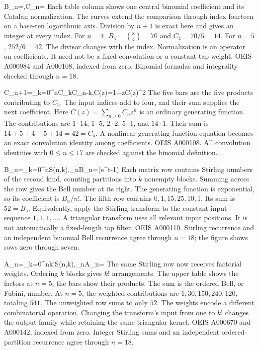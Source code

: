 {B_n=,\qquad C_n=}
{Each table column shows one central binomial coefficient and its Catalan normalization. The curves extend the comparison through index fourteen on a base-ten logarithmic axis. Division by $n+1$ is exact here and gives an integer at every index.}
{For $n=4$, $B_4=\binom84=70$ and $C_4=70/5=14$. For $n=5$, $252/6=42$. The divisor changes with the index.}
{Normalization is an operator on coefficients. It need not be a fixed convolution or a constant tap weight.}
{OEIS A000984 and A000108, indexed from zero. Binomial formulas and integrality checked through $n=18$.}

{C_{n+1}=\sum_{k=0}^{n}C_kC_{n-k},\qquad C(z)=1+zC(z)^2}
{The five bars are the five products contributing to $C_5$. The input indices add to four, and their sum supplies the next coefficient. Here $C(z)=\sum_{n\ge0}C_nz^n$ is an ordinary generating function.}
{The contributions are $1\cdot14$, $1\cdot5$, $2\cdot2$, $5\cdot1$, and $14\cdot1$. Their sum is $14+5+4+5+14=42=C_5$.}
{A nonlinear generating-function equation becomes an exact convolution identity among coefficients.}
{OEIS A000108. All convolution identities with $0\le n\le17$ are checked against the binomial definition.}

{B_n=\sum_{k=0}^{n}S(n,k),\qquad \sum_{n}B_n=\exp(e^t-1)}
{Each matrix row contains Stirling numbers of the second kind, counting partitions into $k$ nonempty blocks. Summing across the row gives the Bell number at its right. The generating function is exponential, so its coefficient is $B_n/n!$.}
{The fifth row contains $0,1,15,25,10,1$. Its sum is $52=B_5$. Equivalently, apply the Stirling transform to the constant input sequence $1,1,1,\ldots$.}
{A triangular transform uses all relevant input positions. It is not automatically a fixed-length tap filter.}
{OEIS A000110. Stirling recurrence and an independent binomial Bell recurrence agree through $n=18$; the figure shows rows zero through seven.}

{A_n=\sum_{k=0}^{n}k!S(n,k),\qquad \sum_{n}A_n=}
{The same Stirling row now receives factorial weights. Ordering $k$ blocks gives $k!$ arrangements. The upper table shows the factors at $n=5$; the bars show their products. The sum is the ordered Bell, or Fubini, number.}
{At $n=5$, the weighted contributions are $1,30,150,240,120$, totaling $541$. The unweighted row sums to only $52$. The weights encode a different combinatorial operation.}
{Changing the transform's input from one to $k!$ changes the output family while retaining the same triangular kernel.}
{OEIS A000670 and A000142, indexed from zero. Integer Stirling sums and an independent ordered-partition recurrence agree through $n=18$.}

